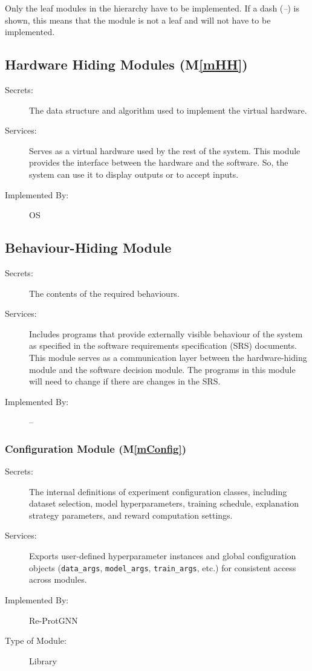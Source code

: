\documentclass[12pt, titlepage]{article}
\newcommand{\mref}[1]{M\ref{#1}}
\begin{document}
Only the leaf modules in the hierarchy have to be implemented. If a dash
(\emph{--}) is shown, this means that the module is not a leaf and will not have
to be implemented.

\subsection{Hardware Hiding Modules (\mref{mHH})}

\begin{description}
\item[Secrets:]The data structure and algorithm used to implement the virtual
  hardware.
\item[Services:]Serves as a virtual hardware used by the rest of the
  system. This module provides the interface between the hardware and the
  software. So, the system can use it to display outputs or to accept inputs.
\item[Implemented By:] OS
\end{description}

\subsection{Behaviour-Hiding Module}

\begin{description}
\item[Secrets:]The contents of the required behaviours.
\item[Services:]Includes programs that provide externally visible behaviour of
  the system as specified in the software requirements specification (SRS)
  documents. This module serves as a communication layer between the
  hardware-hiding module and the software decision module. The programs in this
  module will need to change if there are changes in the SRS.
\item[Implemented By:] --
\end{description}


\subsubsection{Configuration Module (\mref{mConfig})}

\begin{description}
\item[Secrets:] The internal definitions of experiment configuration classes, including dataset selection, model hyperparameters, training schedule, explanation strategy parameters, and reward computation settings.

\item[Services:] Exports user-defined hyperparameter instances and global configuration objects (\texttt{data\_args}, \texttt{model\_args}, \texttt{train\_args}, etc.) for consistent access across modules.

\item[Implemented By:] Re-ProtGNN

\item[Type of Module:] Library

\end{description}
\end{document}
